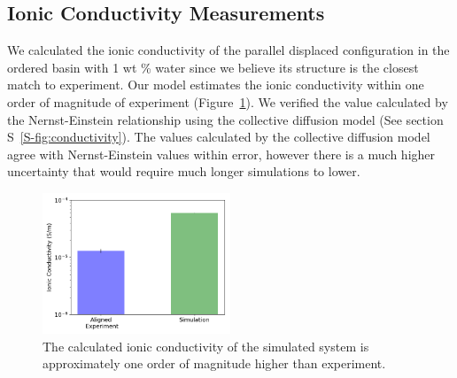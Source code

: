 \documentclass[journal=jpcbfk,manuscript=article]{achemso}
\begin{document}
  \subsection{Ionic Conductivity Measurements}
 

  
  
  
  We calculated the ionic conductivity of the parallel displaced configuration in
  the ordered basin with 1 wt \% water since we believe its structure is the 
  closest match to experiment. Our model estimates the ionic conductivity within
  one order of magnitude of experiment (Figure~\ref{fig:ionic_conductivity}). We
  verified the value calculated by the Nernst-Einstein relationship using 
  the collective diffusion model\cite{liu_collective_2013} 
  (See section S~\ref{S-fig:conductivity}). The values calculated by the 
  collective diffusion model agree with Nernst-Einstein  values within error, 
  however there is a much higher uncertainty that would require much longer 
  simulations to lower.
  

  \begin{figure}
  \centering
  \includegraphics[width=0.5\textwidth]{IC_nernst.png}
  \caption{The calculated ionic conductivity of the simulated system is approximately
  one order of magnitude higher than experiment.}\label{fig:ionic_conductivity}
  \end{figure}
\end{document}
